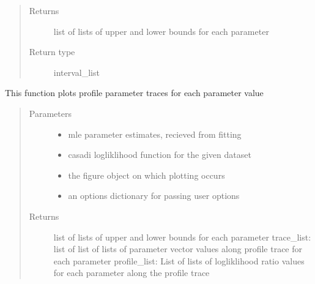 \documentclass[letterpaper,10pt,english,openany,oneside]{sphinxmanual}
\begin{document}
\begin{fulllineitems}
\begin{fulllineitems}
\begin{quote}
\begin{description}
\begin{itemize}
\end{itemize}

\item[{Returns}] \leavevmode
list of lists of upper and lower bounds for each parameter

\item[{Return type}] \leavevmode
interval\_list

\end{description}\end{quote}

\end{fulllineitems}


\begin{fulllineitems}
\label{\detokenize{nloed:nloed.model.Model.__profileplot}}
This function plots profile parameter traces for each parameter value
\begin{quote}\begin{description}
\item[{Parameters}] \leavevmode\begin{itemize}
\item {} 
 \textendash{} mle parameter estimates,  recieved from fitting

\item {} 
 \textendash{} casadi logliklihood function for the given dataset

\item {} 
 \textendash{} the figure object on which plotting occurs

\item {} 
 \textendash{} an options dictionary for passing user options

\end{itemize}

\item[{Returns}] \leavevmode
list of lists of upper and lower bounds for each parameter
trace\_list: list of list of lists of parameter vector values along profile trace for each parameter
profile\_list: List of lists of logliklihood ratio values for each parameter along the profile trace


\end{description}
\end{quote}
\end{fulllineitems}
\end{fulllineitems}
\end{document}
